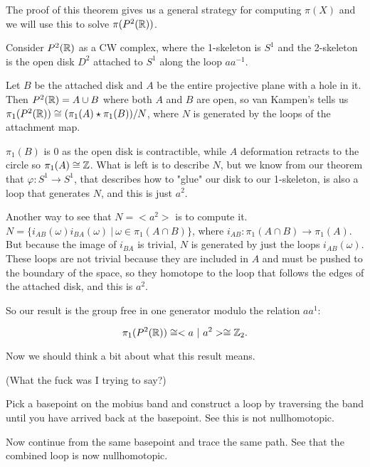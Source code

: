 \documentclass[10pt]{article}
\begin{document}
The proof of this theorem gives us a general strategy for computing $\pi(X)$
and we will use this to solve $\pi(P^2(\mathbb{R}))$.

Consider $P^2(\mathbb{R})$ as a CW complex, where the 1-skeleton is $S^1$ and the
2-skeleton is the open disk $D^2$ attached to $S^1$ along the loop $a a^{-1}$.

Let $B$ be the attached disk and $A$ be the entire projective plane with a hole in
it. Then $P^2(\mathbb{R}) = A \cup B$ where both $A$ and $B$ are open, so van Kampen's
tells us $\pi_1(P^2(\mathbb{R})) \cong (\pi_1(A) \star \pi_1(B)) / N$, where $N$ is
generated by the loops of the attachment map.

$\pi_1(B)$ is 0 as the open disk is contractible, while $A$ deformation
retracts to the circle so $\pi_1(A) \cong \mathbb{Z}$. What is left is to describe $N$,
but we know from our theorem that $\varphi: S^1 \to S^1$, that describes how to "glue" our disk to
our 1-skeleton, is also a loop that generates $N$, and this is just $a^2$.

Another way to see that $N = < a^2 >$ is to compute it. 
$N = \{ i_{AB}(\omega)i_{BA}(\omega) ~|~ \omega \in \pi_1(A \cap B) \}$, where
$i_{AB}: \pi_1(A \cap B) \to \pi_1(A)$. But because the image of $i_{BA}$ is
trivial, $N$ is generated by just the loops $i_{AB}(\omega)$. These loops are
not trivial because they are included in $A$ and must be pushed to the boundary
of the space, so they homotope to the loop that follows the edges of the
attached disk, and this is $a^2$.



So our result is the group free in one generator modulo the relation $aa^1$:

\[\pi_1(P^2(\mathbb{R})) \cong < a ~|~ a^2 > \cong \mathbb{Z}_2.\]

Now we should think a bit about what this result means.

\begin{note}

(What the fuck was I trying to say?)

Pick a basepoint on the mobius band and construct a loop by traversing the band
until you have arrived back at the basepoint. See this is not nullhomotopic.

Now continue from the same basepoint and trace the same path. See that the
combined loop is now nullhomotopic.


\end{note}
\end{document}
